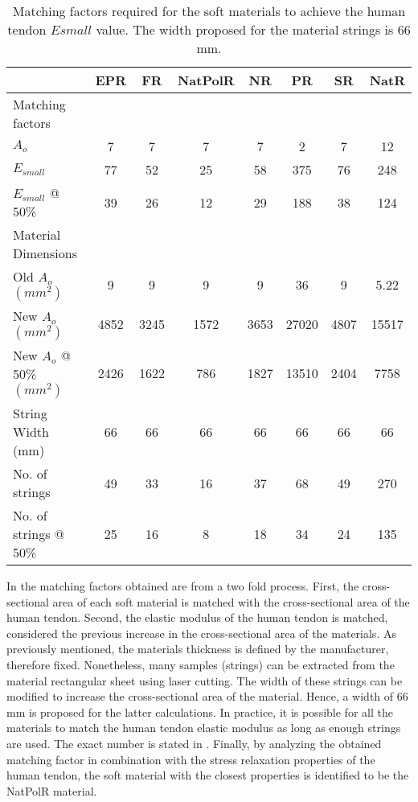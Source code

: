 \begin{table}[htbp!]
    \centering
    \caption{Matching factors required for the soft materials to achieve the human tendon $E{small}$ value. The width proposed for the material strings is 66 mm.}
    \begin{tabular}{lccccccc}
    \toprule
                            & EPR & FR & NatPolR & NR & PR & SR & NatR \\
    \hline
    Matching factors \\
    \hline
    $A_o$                   & 7 & 7 & 7 & 7 & 2 & 7 & 12\\
    $E_{small}$              & 77                     & 52           & 25                     & 58      & 375          & 76       & 248           \\
    $E_{small}$ @ 50\%                          & 39                     & 26           & 12                     & 29      & 188          & 38       & 124           \\
    \hline
    Material Dimensions \\
    \midrule
    Old $A_o$ $(mm^2)$              & 9 & 9 & 9 & 9 & 36    & 9 & 5.22  \\
    New $A_o$ $(mm^2)$         & 4852                   & 3245         & 1572                   & 3653    & 27020        & 4807     & 15517         \\
    New $A_o$ @ 50\% $(mm^2)$  & 2426                   & 1622         & 786                    & 1827    & 13510        & 2404     & 7758          \\
    String Width (mm)       & 66  & 66    & 66    & 66    & 66    & 66    & 66    \\
    No. of strings          & 49    & 33    & 16    & 37    & 68    & 49   & 270  \\
    No. of strings @ 50\%   & 25    & 16    & 8     & 18    & 34    & 24   & 135  \\
    \bottomrule
    \end{tabular}
    \label{tbl:matching}
\end{table}

In  the matching factors obtained are from a two fold process. First, the cross-sectional area of each soft material is matched with the cross-sectional area of the human tendon. Second, the elastic modulus of the human tendon is matched, considered the previous increase in the cross-sectional area of the materials. As previously mentioned, the materials thickness is defined by the manufacturer, therefore fixed. Nonetheless, many samples (strings) can be extracted from the material rectangular sheet using laser cutting. The width of these strings can be modified to increase the cross-sectional area of the material. Hence, a width of 66 mm is proposed for the latter calculations. In practice, it is possible for all the materials to match the human tendon elastic modulus as long as enough strings are used. The exact number is stated in . Finally, by analyzing the obtained matching factor in combination with the stress relaxation properties of the human tendon, the soft material with the closest properties is identified to be the NatPolR material.

